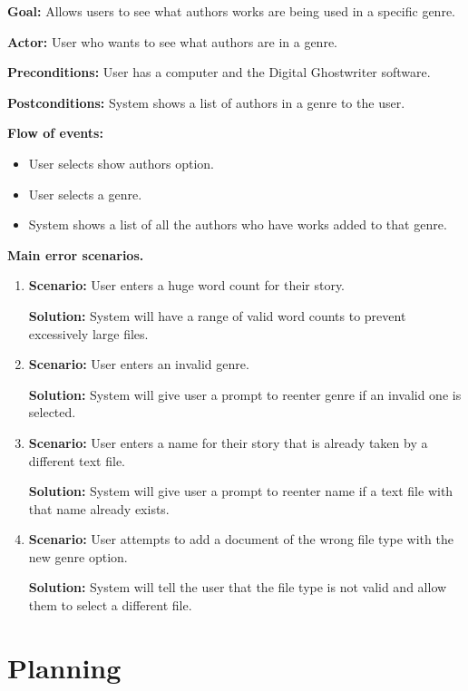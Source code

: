 \documentclass[12pt]{article}
\begin{document}
\textbf{Goal:} Allows users to see what authors works are being used in a specific genre.

\textbf{Actor:} User who wants to see what authors are in a genre.

\textbf{Preconditions:} User has a computer and the Digital Ghostwriter software.

\textbf{Postconditions:} System shows a list of authors in a genre to the user.

\textbf{Flow of events:}

\begin{itemize}
\item User selects show authors option.
\item User selects a genre.
\item System shows a list of all the authors who have works added to that genre.
\end{itemize}


{\Large\textbf{Main error scenarios.}\par}

\begin{enumerate}
\item \textbf{Scenario:} User enters a huge word count for their story.

\textbf{Solution:} System will have a range of valid word counts to prevent excessively large files.
\item \textbf{Scenario:} User enters an invalid genre.

\textbf{Solution:} System will give user a prompt to reenter genre if an invalid one is selected.

\item \textbf{Scenario:} User enters a name for their story that is already taken by a different text file.

\textbf{Solution:} System will give user a prompt to reenter name if a text file with that name already exists.

\item \textbf{Scenario:} User attempts to add a document of the wrong file type with the new genre option.

\textbf{Solution:} System will tell the user that the file type is not valid and allow them to select a different file.

\end{enumerate}

\newpage

\section{Planning}
\end{document}
